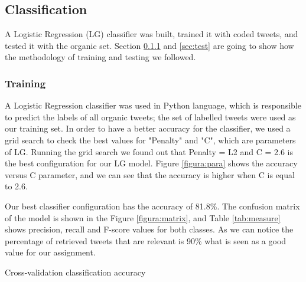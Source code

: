 \documentclass{sig-alternate}
\begin{document}
\subsection{Classification}

A Logistic Regression (LG) classifier was built, trained it with coded tweets, and tested it with the organic set. Section \ref{sec:train} and \ref{sec:test} are going to show how the methodology of training and testing we followed.

\subsubsection{Training}
\label{sec:train}

A Logistic Regression classifier was used in Python language, which is responsible to predict the labels of all organic tweets; the set of labelled tweets were used as our training set. In order to have a better accuracy for the classifier, we used a grid search to check the best values for "Penalty" and "C", which are parameters of LG. Running the grid search we found out that Penalty = L2 and C = 2.6 is the best configuration for our LG model. Figure \ref{figura:para} shows the accuracy versus C parameter, and we can see that the accuracy is higher when C is equal to 2.6.


Our best classifier configuration has the accuracy of 81.8\%. The confusion matrix of the model is shown in the Figure \ref{figura:matrix}, and Table \ref{tab:measure} shows precision, recall and F-score values for both classes. As we can notice the percentage of retrieved tweets that are relevant is 90\% what is seen as a good value for our assignment.

\begin{table}[t]
\caption{Cross-validation classification accuracy \label{tab:measure}}
\centering

\end{table}

\end{document}
